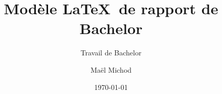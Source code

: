 \author{Maël Michod}


\title{Modèle \LaTeX~de rapport de Bachelor}

\subtitle{Travail de Bachelor}


\date{\today}


